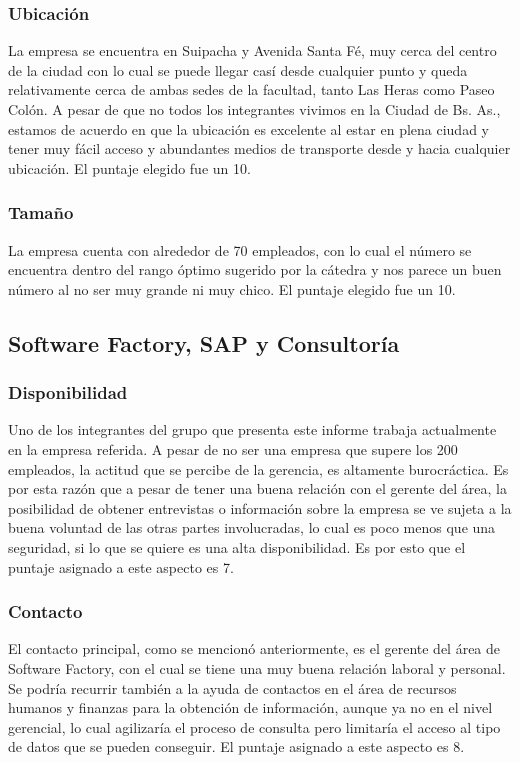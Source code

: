 \documentclass[12pt,a4paper,spanish]{article}
\begin{document}
\subsubsection{Ubicaci\'{o}n}
La empresa se encuentra en Suipacha y Avenida Santa F\'{e}, muy cerca del centro de la ciudad con lo cual se puede llegar cas\'{i} desde cualquier punto y queda relativamente cerca de ambas sedes de la facultad, tanto Las Heras como Paseo Col\'{o}n. A pesar de que no todos los integrantes vivimos en la Ciudad de Bs. As., estamos de acuerdo en que la ubicaci\'{o}n es excelente al estar en plena ciudad y tener muy f\'{a}cil acceso y abundantes medios de transporte desde y hacia cualquier ubicaci\'on. El puntaje elegido fue un 10.

\subsubsection{Tama\~{n}o}
La empresa cuenta con alrededor de 70 empleados, con lo cual el n\'umero se encuentra dentro del rango \'optimo sugerido por la c\'atedra y nos parece un buen n\'{u}mero al no ser muy grande ni muy chico. El puntaje elegido fue un 10.

\subsection{Software Factory, SAP y Consultor\'{i}a}
\subsubsection{Disponibilidad}

Uno de los integrantes del grupo que presenta este informe trabaja actualmente en la empresa referida. A pesar de no ser una empresa que supere los 200 empleados, la actitud que se percibe de la gerencia, es altamente burocr\'{a}ctica. Es por esta raz\'{o}n que a pesar de tener una buena relaci\'{o}n con el gerente del \'{a}rea, la posibilidad de obtener entrevistas o informaci\'{o}n sobre la empresa se ve sujeta a la buena voluntad de las otras partes involucradas, lo cual es poco menos que una seguridad, si lo que se quiere es una alta disponibilidad. Es por esto que el puntaje asignado a este aspecto es 7.

\subsubsection{Contacto}

El contacto principal, como se mencion\'{o} anteriormente, es el gerente del \'{a}rea de Software Factory, con el cual se tiene una muy buena relaci\'{o}n laboral y personal. Se podr\'{i}a recurrir tambi\'{e}n a la ayuda de contactos en el \'{a}rea de recursos humanos y finanzas para la obtenci\'{o}n de informaci\'{o}n, aunque ya no en el nivel gerencial, lo cual agilizar\'{i}a el proceso de consulta pero limitar\'{i}a el acceso al tipo de datos que se pueden conseguir. El puntaje asignado a este aspecto es 8.
\end{document}
